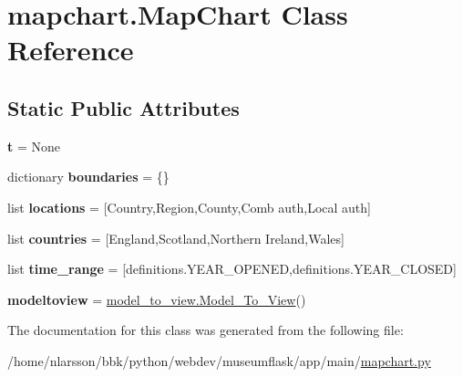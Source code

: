 \hypertarget{classmapchart_1_1MapChart}{}\section{mapchart.\+Map\+Chart Class Reference}
\label{classmapchart_1_1MapChart}
\subsection*{Static Public Attributes}
\begin{DoxyCompactItemize}
\item 
\mbox{\label{classmapchart_1_1MapChart_addacc2bc22d082a472891cb53091c07a}} 
{\bfseries t} = None
\item 
\mbox{\label{classmapchart_1_1MapChart_a7192c46b3646e52852695ddbc50fc933}} 
dictionary {\bfseries boundaries} = \{\}
\item 
\mbox{\label{classmapchart_1_1MapChart_ac9fceb40c1469fe4c7fcbcd529dda644}} 
list {\bfseries locations} = \mbox{[}\textquotesingle{}Country\textquotesingle{},\textquotesingle{}Region\textquotesingle{},\textquotesingle{}County\textquotesingle{},\textquotesingle{}Comb auth\textquotesingle{},\textquotesingle{}Local auth\textquotesingle{}\mbox{]}
\item 
\mbox{\label{classmapchart_1_1MapChart_a4db5f1a0f55306a832b14e9611ca69a0}} 
list {\bfseries countries} = \mbox{[}\textquotesingle{}England\textquotesingle{},\textquotesingle{}Scotland\textquotesingle{},\textquotesingle{}Northern Ireland\textquotesingle{},\textquotesingle{}Wales\textquotesingle{}\mbox{]}
\item 
\mbox{\label{classmapchart_1_1MapChart_ae6184211871c7aeadff6608f1e3d2cd5}} 
list {\bfseries time\+\_\+range} = \mbox{[}definitions.\+Y\+E\+A\+R\+\_\+\+O\+P\+E\+N\+ED,definitions.\+Y\+E\+A\+R\+\_\+\+C\+L\+O\+S\+ED\mbox{]}
\item 
\mbox{\label{classmapchart_1_1MapChart_ac465f003d9b4da49fa72d65a8f60177e}} 
{\bfseries modeltoview} = \mbox{\hyperlink{classmodel__to__view_1_1Model__To__View}{model\+\_\+to\+\_\+view.\+Model\+\_\+\+To\+\_\+\+View}}()
\end{DoxyCompactItemize}


The documentation for this class was generated from the following file\+:\begin{DoxyCompactItemize}
\item 
/home/nlarsson/bbk/python/webdev/museumflask/app/main/\mbox{\hyperlink{mapchart_8py}{mapchart.\+py}}\end{DoxyCompactItemize}
